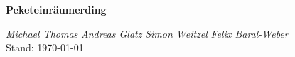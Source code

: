 \documentclass[a4paper, 12pt]{scrartcl}
\begin{document}
\begin{normalsize}

\raggedright\textbf{\Huge Peketeinräumerding}\\	
		\begin{flushright}
		\textit{Michael Thomas}
		\textit{Andreas Glatz}
		\textit{Simon Weitzel}
		\textit{Felix Baral-Weber}\\
		Stand: \space \today \space \thistime
		\end{flushright}

\end{normalsize}
\tableofcontents




%
\end{document}
